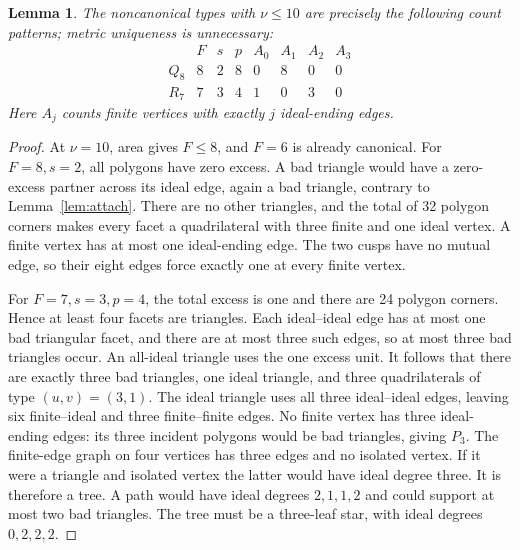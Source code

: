 \documentclass[11pt]{article}
\newtheorem{lemma}[theorem]{Lemma}
\newcommand{\Pthree}{P_3}
\newcommand{\Qeight}{Q_8}
\begin{document}
\begin{lemma}\label{lem:small}
The noncanonical types with $\nu\le10$ are precisely the following
count patterns; metric uniqueness is unnecessary:
\[
\begin{array}{c|ccc|rrrr}
 &F&s&p&A_0&A_1&A_2&A_3\\\hline
 \Qeight&8&2&8&0&8&0&0\\
 R_7&7&3&4&1&0&3&0
\end{array}
\]
Here $A_j$ counts finite vertices with exactly $j$ ideal-ending edges.
\end{lemma}
\begin{proof}
At $\nu=10$, area gives $F\le8$, and $F=6$ is already canonical.
For $F=8,s=2$, all polygons have zero excess. A bad triangle would
have a zero-excess partner across its ideal edge, again a bad triangle,
contrary to Lemma~\ref{lem:attach}. There are no other triangles,
and the total of 32 polygon corners makes every facet a quadrilateral
with three finite and one ideal vertex. A finite vertex has at most
one ideal-ending edge. The two cusps have no mutual edge, so their
eight edges force exactly one at every finite vertex.

For $F=7,s=3,p=4$, the total excess is one and there are 24 polygon
corners. Hence at least four facets are triangles. Each ideal--ideal
edge has at most one bad triangular facet, and there are at most
three such edges, so at most three bad triangles occur. An all-ideal
triangle uses the one excess unit. It follows that there are exactly
three bad triangles, one ideal triangle, and three quadrilaterals
of type $(u,v)=(3,1)$. The ideal triangle uses all three ideal--ideal
edges, leaving six finite--ideal and three finite--finite edges.
No finite vertex has three ideal-ending edges: its three incident
polygons would be bad triangles, giving $\Pthree$.
The finite-edge graph on four vertices has three edges and no isolated
vertex. If it were a triangle and isolated vertex the latter would
have ideal degree three. It is therefore a tree. A path would have
ideal degrees $2,1,1,2$ and could support at most two bad triangles.
The tree must be a three-leaf star, with ideal degrees $0,2,2,2$.
\end{proof}
\end{document}
